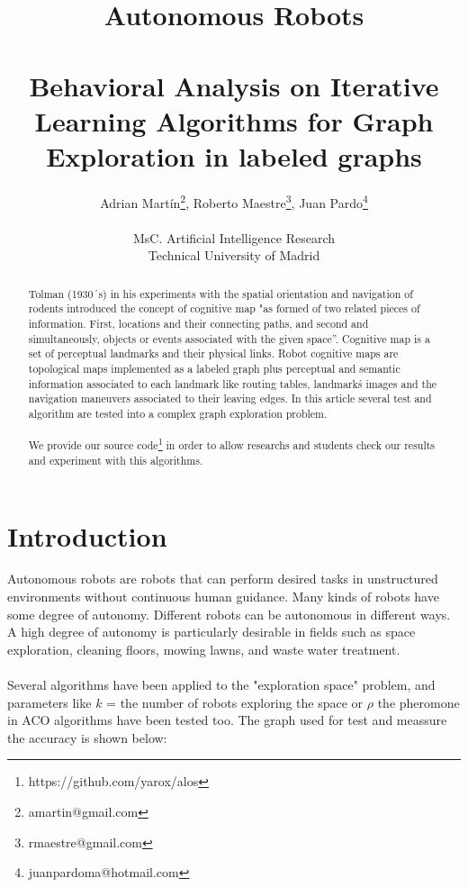 \documentclass[a4paper,11pt]{article}
\begin{document}
\title{{\huge Autonomous Robots} \\ \text{ } \\ Behavioral Analysis on Iterative Learning Algorithms for Graph Exploration in labeled graphs}

\author{{Adrian Martín\footnote{amartin@gmail.com}, Roberto Maestre\footnote{rmaestre@gmail.com}, Juan Pardo\footnote{juanpardoma@hotmail.com}}\\ \\
{\small MsC. Artificial Intelligence Research \\Technical University of Madrid}}

\date{}
\maketitle

\begin{abstract} 
Tolman (1930´s) in his experiments with the spatial orientation and navigation of rodents introduced the concept of cognitive map "as formed of two related 
pieces of information. First, locations and their connecting paths, and second and simultaneously, objects or events associated with the given space”.  Cognitive map is a set of perceptual landmarks and their physical links. Robot cognitive maps are topological maps  implemented as a  labeled graph plus perceptual and semantic information associated to each landmark like routing tables, landmark\'s  images and  the navigation maneuvers associated to their leaving edges. In this article several test and algorithm are tested into a complex graph exploration problem.
\\
\\
We provide our source code\footnote{https://github.com/yarox/alos} in order to allow researchs and students check our results and experiment with this algorithms.
\end{abstract}

\newpage
\setcounter{secnumdepth}{0}
\section{Introduction}

Autonomous robots are robots that can perform desired tasks in unstructured environments without continuous human guidance. Many kinds of robots have some degree of autonomy. Different robots can be autonomous in different ways. A high degree of autonomy is particularly desirable in fields such as space exploration, cleaning floors, mowing lawns, and waste water treatment.
\\
\\
Several algorithms have been applied to the "exploration space" problem, and parameters like $k$ = the number of robots exploring the space or $\rho$ the pheromone in ACO algorithms have been tested too. The graph used for test and meassure the accuracy is shown below:
\end{document}
